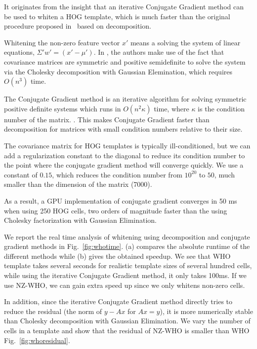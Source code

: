 It originates from the insight that an iterative
Conjugate Gradient method can be used to whiten a HOG template, which
is much faster than the original procedure proposed
in~\cite{Hariharan12} based on decomposition.

Whitening the non-zero
feature vector $x'$ means a solving the system of linear equations, $\Sigma' w' = (x' -
\mu')$. In
\cite{Hariharan12}, the authors make use of the fact that covariance matrices
are symmetric and positive semidefinite to solve the system via the Cholesky
decomposition with Gaussian Elemination, which requires $O(n^3)$ time.

The Conjugate Gradient method is an iterative algorithm for solving symmetric
positive definite systems which runs in $O(n^2\kappa)$ time, where $\kappa$ is
the condition number of the matrix. \cite{Shewchuk94}.
%
This makes Conjugate Gradient faster than decomposition for matrices with small condition
numbers relative to their size.

The covariance matrix for HOG templates is typically ill-conditioned\cite{Hariharan12}, but we
can add a regularization constant to the diagonal to reduce its condition
number to the point where the conjugate gradient method will converge quickly.
We use a constant of $0.15$, which reduces the condition number from $10^{20}$
to $50$, much smaller than the dimension of the matrix (7000).

As a result, a GPU implementation of conjugate gradient converges in 50
ms when using 250 HOG cells, two orders of magnitude faster than the using
Cholesky factorization with Gaussian Elimination.


We report the real time analysis of whitening using decomposition and
conjugate gradient methods in Fig.~\ref{fig:whotime}. (a) compares the
absolute runtime of the different methods while (b) gives the obtained
speedup. We see that %
WHO template takes several seconds for realistic template sizes of
several hundred cells, while using the iterative Conjugate Gradient
method, it only takes 100ms. If we use NZ-WHO, we can gain extra speed
up since we only whitens non-zero cells.

In addition, since the iterative Conjugate Gradient method directly
tries to reduce the residual (the norm of $y-Ax$ for $Ax = y$), it is
more numerically stable than Cholesky decomposition with Gaussian
Elimination. We vary the number of cells in a template and show that
the residual of NZ-WHO is smaller than WHO Fig.~\ref{fig:whoresidual}.

